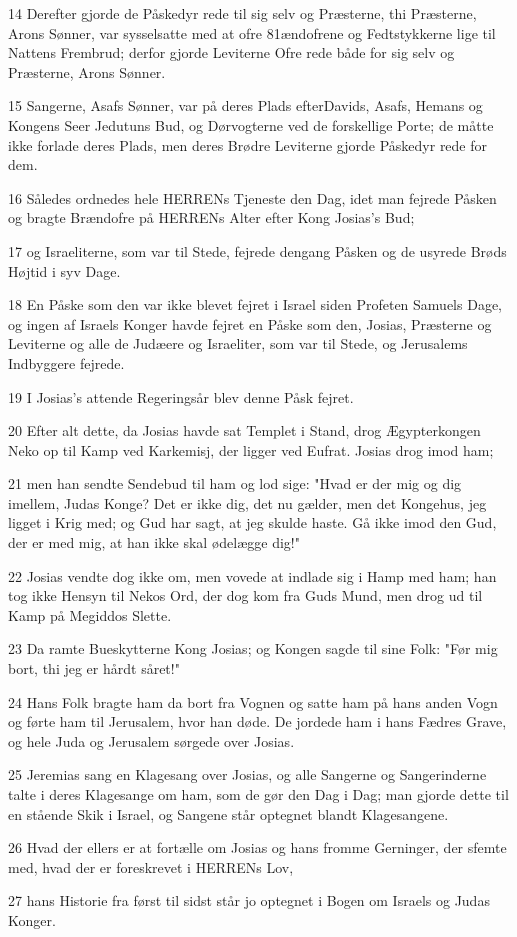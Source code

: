 \par 14 Derefter gjorde de Påskedyr rede til sig selv og Præsterne, thi Præsterne, Arons Sønner, var sysselsatte med at ofre 81ændofrene og Fedtstykkerne lige til Nattens Frembrud; derfor gjorde Leviterne Ofre rede både for sig selv og Præsterne, Arons Sønner.
\par 15 Sangerne, Asafs Sønner, var på deres Plads efterDavids, Asafs, Hemans og Kongens Seer Jedutuns Bud, og Dørvogterne ved de forskellige Porte; de måtte ikke forlade deres Plads, men deres Brødre Leviterne gjorde Påskedyr rede for dem.
\par 16 Således ordnedes hele HERRENs Tjeneste den Dag, idet man fejrede Påsken og bragte Brændofre på HERRENs Alter efter Kong Josias's Bud;
\par 17 og Israeliterne, som var til Stede, fejrede dengang Påsken og de usyrede Brøds Højtid i syv Dage.
\par 18 En Påske som den var ikke blevet fejret i Israel siden Profeten Samuels Dage, og ingen af Israels Konger havde fejret en Påske som den, Josias, Præsterne og Leviterne og alle de Judæere og Israeliter, som var til Stede, og Jerusalems Indbyggere fejrede.
\par 19 I Josias's attende Regeringsår blev denne Påsk fejret.
\par 20 Efter alt dette, da Josias havde sat Templet i Stand, drog Ægypterkongen Neko op til Kamp ved Karkemisj, der ligger ved Eufrat. Josias drog imod ham;
\par 21 men han sendte Sendebud til ham og lod sige: "Hvad er der mig og dig imellem, Judas Konge? Det er ikke dig, det nu gælder, men det Kongehus, jeg ligget i Krig med; og Gud har sagt, at jeg skulde haste. Gå ikke imod den Gud, der er med mig, at han ikke skal ødelægge dig!"
\par 22 Josias vendte dog ikke om, men vovede at indlade sig i Hamp med ham; han tog ikke Hensyn til Nekos Ord, der dog kom fra Guds Mund, men drog ud til Kamp på Megiddos Slette.
\par 23 Da ramte Bueskytterne Kong Josias; og Kongen sagde til sine Folk: "Før mig bort, thi jeg er hårdt såret!"
\par 24 Hans Folk bragte ham da bort fra Vognen og satte ham på hans anden Vogn og førte ham til Jerusalem, hvor han døde. De jordede ham i hans Fædres Grave, og hele Juda og Jerusalem sørgede over Josias.
\par 25 Jeremias sang en Klagesang over Josias, og alle Sangerne og Sangerinderne talte i deres Klagesange om ham, som de gør den Dag i Dag; man gjorde dette til en stående Skik i Israel, og Sangene står optegnet blandt Klagesangene.
\par 26 Hvad der ellers er at fortælle om Josias og hans fromme Gerninger, der sfemte med, hvad der er foreskrevet i HERRENs Lov,
\par 27 hans Historie fra først til sidst står jo optegnet i Bogen om Israels og Judas Konger.

